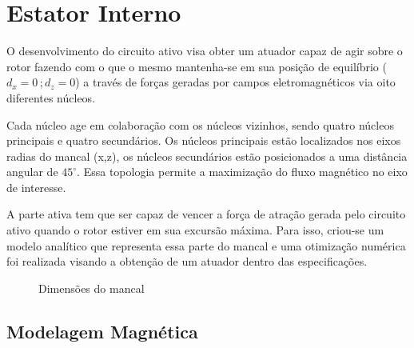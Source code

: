 \pagestyle{empty}
\cleardoublepage
\pagestyle{fancy}

%




\chapter{Estator Interno}
%

O desenvolvimento do circuito ativo visa obter um atuador capaz de agir sobre o rotor fazendo com o que o mesmo mantenha-se em sua posição de equilíbrio ($d_x = 0 \, ; d_z = 0$) a través de forças geradas por campos eletromagnéticos via oito diferentes núcleos.

Cada núcleo age em colaboração com os núcleos vizinhos, sendo quatro núcleos principais e quatro secundários. Os núcleos principais estão localizados nos eixos radias do mancal (x,z), os núcleos secundários estão posicionados a uma distância angular de $45 ^\circ$. Essa topologia permite a maximização do fluxo magnético no eixo de interesse.

A parte ativa tem que ser capaz de vencer a força de atração gerada pelo circuito ativo quando o rotor estiver em sua excursão máxima. Para isso, criou-se um modelo analítico que representa essa parte do mancal e uma otimização numérica foi realizada visando a obtenção de um atuador dentro das especificações.

\begin{figure}[!ht]
	\centering
	\def\svgwidth{1\columnwidth}
	
	\caption{Dimensões do mancal}
	\label{Fig:modelagem:dim:ativo}
\end{figure}

\section{Modelagem Magnética}

